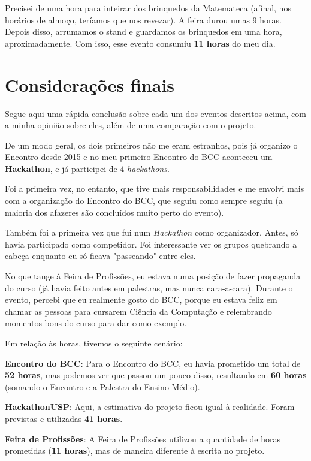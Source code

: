 \documentclass[12pt,letterpaper]{article}
\begin{document}
	Precisei de uma hora para inteirar dos brinquedos da Matemateca (afinal, nos horários de almoço, teríamos que nos revezar). A feira durou umas 9 horas. Depois disso, arrumamos o stand e guardamos os brinquedos em uma hora, aproximadamente. Com isso, esse evento consumiu \textbf{11 horas} do meu dia.
	
	\section*{Considerações finais}
	Segue aqui uma rápida conclusão sobre cada um dos eventos descritos acima, com a minha opinião sobre eles, além de uma comparação com o projeto.
	
	De um modo geral, os dois primeiros não me eram estranhos, pois já organizo o Encontro desde 2015 e no meu primeiro Encontro do BCC aconteceu um \textbf{Hackathon}, e já participei de 4 \textit{hackathons}.
	
	Foi a primeira vez, no entanto, que tive mais responsabilidades e me envolvi mais com a organização do Encontro do BCC, que seguiu como sempre seguiu (a maioria dos afazeres são concluídos muito perto do evento).
	
	Também foi a primeira vez que fui num \textit{Hackathon} como organizador. Antes, só havia participado como competidor. Foi interessante ver os grupos quebrando a cabeça enquanto eu só ficava "passeando" entre eles.
	
	No que tange à Feira de Profissões, eu estava numa posição de fazer propaganda do curso (já havia feito antes em palestras, mas nunca cara-a-cara). Durante o evento, percebi que eu realmente gosto do BCC, porque eu estava feliz em chamar as pessoas para cursarem Ciência da Computação e relembrando momentos bons do curso para dar como exemplo.
	
	Em relação às horas, tivemos o seguinte cenário:
	
	\textbf{Encontro do BCC}: Para o Encontro do BCC, eu havia prometido um total de \textbf{52 horas}, mas podemos ver que passou um pouco disso, resultando em \textbf{60 horas} (somando o Encontro e a Palestra do Ensino Médio).
	
	\textbf{HackathonUSP}:	Aqui, a estimativa do projeto ficou igual à realidade. Foram previstas e utilizadas \textbf{41 horas}.
	
	\textbf{Feira de Profissões}: A Feira de Profissões utilizou a quantidade de horas prometidas (\textbf{11 horas}), mas de maneira diferente à escrita no projeto.
	
\end{document}
